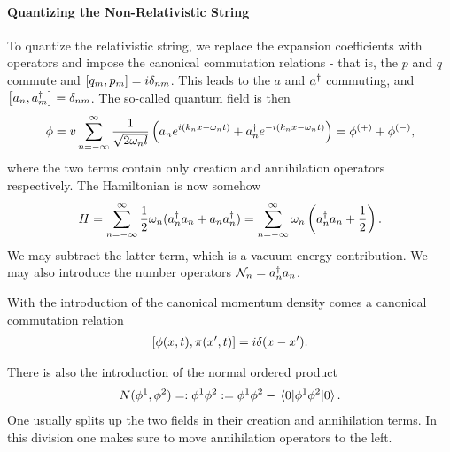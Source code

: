 \paragraph{Quantizing the Non-Relativistic String}
To quantize the relativistic string, we replace the expansion coefficients with operators and impose the canonical commutation relations - that is, the $p$ and $q$ commute and $\comm{q_{m}}{p_{m}} = i\delta_{nm}$. This leads to the $a$ and $a^{\dagger}$ commuting, and $\comm{a_{n}}{a_{m}\adj} = \delta_{nm}$. The so-called quantum field is then
\begin{align*}
	\phi = v\sum\limits_{n = -\infty}^{\infty}\frac{1}{\sqrt{2\omega_{n}l}}\left(a_{n}e^{i(k_{n}x - \omega_{n}t)} + a_{n}^{\dagger} e^{-i(k_{n}x - \omega_{n}t)}\right) = \phi^{(+)} + \phi^{(-)},
\end{align*}
where the two terms contain only creation and annihilation operators respectively. The Hamiltonian is now somehow
\begin{align*}
	H = \sum\limits_{n = -\infty}^{\infty}\frac{1}{2}\omega_{n}(a_{n}^{\dagger} a_{n} + a_{n}a_{n}^{\dagger}) = \sum\limits_{n = -\infty}^{\infty}\omega_{n}\left(a_{n}^{\dagger} a_{n} + \frac{1}{2}\right).
\end{align*}
We may subtract the latter term, which is a vacuum energy contribution. We may also introduce the number operators $\mathcal{N}_{n} = a_{n}^{\dagger} a_{n}$.

With the introduction of the canonical momentum density comes a canonical commutation relation
\begin{align*}
	\comm{\phi(x, t)}{\pi(x\p, t)} = i\delta(x - x\p).
\end{align*}

There is also the introduction of the normal ordered product
\begin{align*}
	N(\phi^{1}, \phi^{2}) = :\phi^{1}\phi^{2}: = \phi^{1}\phi^{2} - \expval{\phi^{1}\phi^{2}}{0}.
\end{align*}
One usually splits up the two fields in their creation and annihilation terms. In this division one makes sure to move annihilation operators to the left.